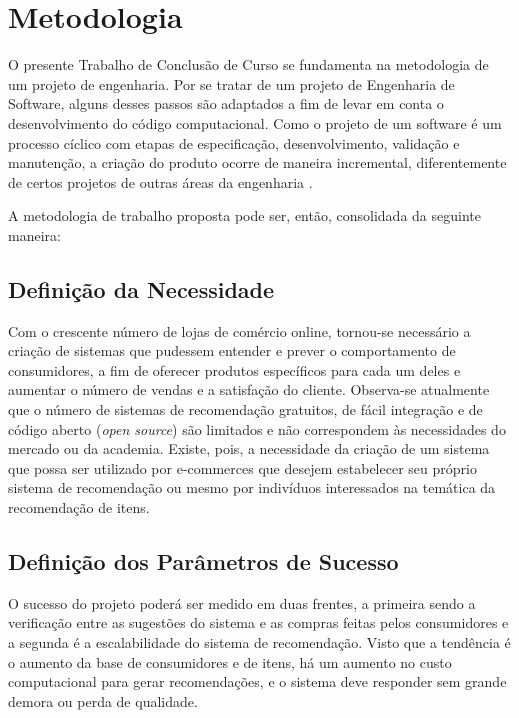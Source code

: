 \chapter[Metodologia]{Metodologia}
\label{chap:metodologia}

O presente Trabalho de Conclusão de Curso se fundamenta na metodologia de um projeto de engenharia. Por se tratar de um projeto de Engenharia de Software, alguns desses passos são adaptados a fim de levar em conta o desenvolvimento do código computacional. Como o projeto de um software é um processo cíclico com etapas de especificação, desenvolvimento, validação e manutenção, a criação do produto ocorre de maneira incremental, diferentemente de certos projetos de outras áreas da engenharia \cite{iterative-development}. 

A metodologia de trabalho proposta pode ser, então, consolidada da seguinte maneira: 

\section{Definição da Necessidade} %
\label{sec:defini_o_da_necessidade}


Com o crescente número de lojas de comércio online, tornou-se necessário a criação de sistemas que pudessem entender e prever o comportamento de consumidores, a fim de oferecer produtos específicos para cada um deles e aumentar o número de vendas e a satisfação do cliente. Observa-se atualmente que o número de sistemas de recomendação gratuitos, de fácil integração e de código aberto (\textit{open source}) são limitados e não correspondem às necessidades do mercado ou da academia. Existe, pois, a necessidade da criação de um sistema que possa ser utilizado por e-commerces que desejem estabelecer seu próprio sistema de recomendação ou mesmo por indivíduos interessados na temática da recomendação de itens.

\section{Definição dos Parâmetros de Sucesso} %
\label{sec:defini_o_dos_par_metros_de_sucesso}


O sucesso do projeto poderá ser medido em duas frentes, a primeira sendo a verificação entre as sugestões do sistema e as compras feitas pelos consumidores e a segunda é a escalabilidade do sistema de recomendação. Visto que a tendência é o aumento da base de consumidores e de itens, há um aumento no custo computacional para gerar recomendações, e o sistema deve responder sem grande demora ou perda de qualidade.

